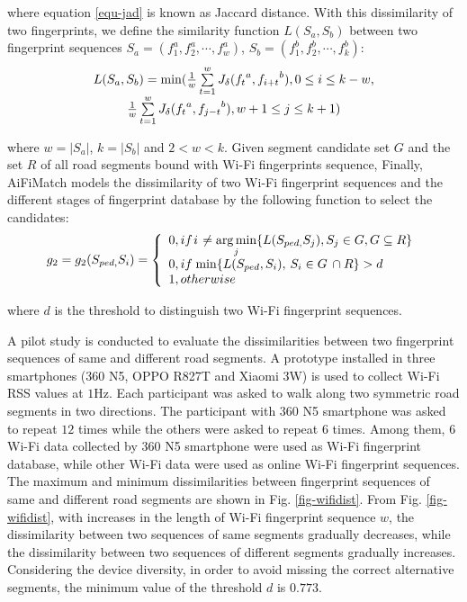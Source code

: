 \documentclass{llncs}
\begin{document}
where equation \ref{equ-jad} is known as Jaccard distance. With this dissimilarity of two fingerprints, we define the similarity function $L(S_a, S_b)$ between two fingerprint sequences $S_a = (f_1^a,f_2^a,\cdots,f_w^a)$, $S_b = (f_1^b, f_2^b, \cdots, f_k^b)$:
\begin{equation}
\begin{array}{c}
L({S_a},{\rm{ }}{S_b}) = \min (\frac{1}{w}\sum\limits_{t = 1}^w {{J_\delta }({f_t}^a,{f_{i + t}}^b),0 \le i \le k - w,} \\
\frac{1}{w}\sum\limits_{t = 1}^w {{J_\delta }({f_t}^a,{f_{j - t}}^b),w + 1 \le j \le k + 1} )
\end{array}
\end{equation}

where $w=|S_a|$, $k=|S_b|$ and $2<w<k$. Given segment candidate set $G$ and the set $R$ of all road segments bound with Wi-Fi fingerprints sequence, Finally, AiFiMatch models the dissimilarity of two Wi-Fi fingerprint sequences and the different stages of fingerprint database by the following function to select the candidates: 
\begin{equation}
{g_2} = {g_2}({S_{ped,}}{S_i}) = \left\{ {\begin{array}{*{20}{l}}
	{0,if{\kern 1pt} i{\kern 1pt}  \ne \mathop {\arg \min }\limits_j \{ L({S_{ped,}}{S_j}),{S_j} \in G,G \subseteq R\} }\\
	{0,if{\kern 1pt} \min \{ L({S_{ped}},{S_i}),{\kern 1pt} {\kern 1pt} {S_i} \in G{\kern 1pt} {\kern 1pt}  \cap R\}  > d{\kern 1pt} {\kern 1pt} }\\
	{1,otherwise}
	\end{array}} \right.
\end{equation}

where $d$ is the threshold to distinguish two Wi-Fi fingerprint sequences. 

A pilot study is conducted to evaluate the dissimilarities between two fingerprint sequences of same and different road segments. A prototype installed in three smartphones (360 N5, OPPO R827T and Xiaomi 3W) is used to collect Wi-Fi RSS values at $1$Hz. Each participant was asked to walk along two symmetric road segments in two directions. The participant with 360 N5 smartphone was asked to repeat $12$ times while the others were asked to repeat $6$ times. Among them, $6$ Wi-Fi data collected by 360 N5 smartphone were used as Wi-Fi fingerprint database, while other Wi-Fi data were used as online Wi-Fi fingerprint sequences. The maximum and minimum dissimilarities between fingerprint sequences of same and different road segments are shown in Fig. \ref{fig-wifidist}. From Fig. \ref{fig-wifidist}, with increases in the length of Wi-Fi fingerprint sequence $w$, the dissimilarity between two sequences of same segments gradually decreases, while the dissimilarity between two sequences of different segments gradually increases. Considering the device diversity, in order to avoid missing the correct alternative segments, the minimum value of the threshold $d$ is $0.773$.
\end{document}

